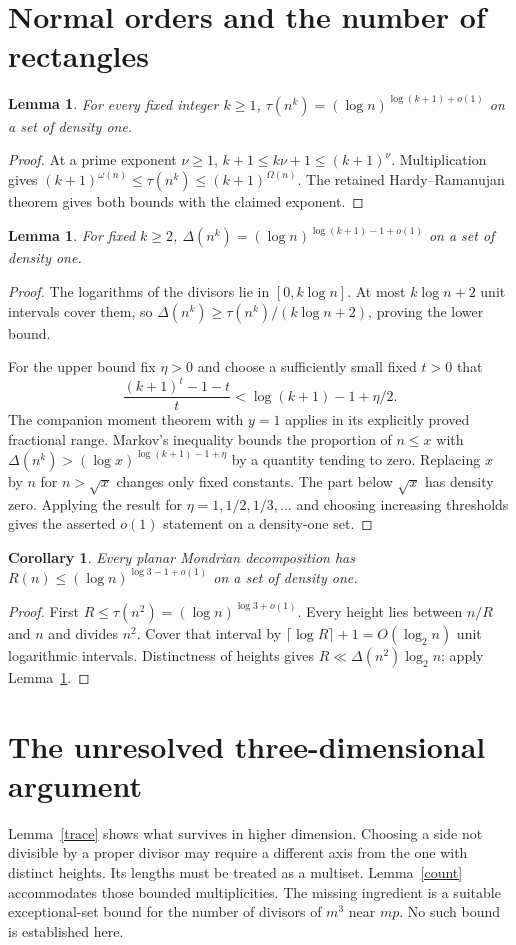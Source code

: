\documentclass[11pt,a4paper]{article}
\newtheorem{lemma}[theorem]{Lemma}
\newtheorem{corollary}[theorem]{Corollary}
\newcommand{\Del}{\Delta}
\newcommand{\om}{\omega}
\newcommand{\Om}{\Omega}
\begin{document}
\section{Normal orders and the number of rectangles}
\begin{lemma}
For every fixed integer $k\ge1$,
$\tau(n^k)=(\log n)^{\log(k+1)+o(1)}$ on a set of density one.
\end{lemma}
\begin{proof}
At a prime exponent $\nu\ge1$,
$k+1\le k\nu+1\le(k+1)^\nu$. Multiplication gives
$(k+1)^{\om(n)}\le\tau(n^k)\le(k+1)^{\Om(n)}$.
The retained Hardy--Ramanujan theorem gives both bounds with the
claimed exponent.
\end{proof}

\begin{lemma}\label{normal}
For fixed $k\ge2$,
$\Del(n^k)=(\log n)^{\log(k+1)-1+o(1)}$ on a set of density one.
\end{lemma}
\begin{proof}
The logarithms of the divisors lie in $[0,k\log n]$. At most
$k\log n+2$ unit intervals cover them, so
$\Del(n^k)\ge\tau(n^k)/(k\log n+2)$, proving the lower bound.

For the upper bound fix $\eta>0$ and choose a sufficiently small
fixed $t>0$ that
\[
 \frac{(k+1)^t-1-t}{t}<\log(k+1)-1+\eta/2.
\]
The companion moment theorem with $y=1$ applies in its explicitly
proved fractional range. Markov's inequality bounds the proportion of
$n\le x$ with
$\Del(n^k)>(\log x)^{\log(k+1)-1+\eta}$ by a quantity tending to zero.
Replacing $x$ by $n$ for $n>\sqrt x$ changes only fixed constants.
The part below $\sqrt x$ has density zero. Applying the result for
$\eta=1,1/2,1/3,\ldots$ and choosing increasing thresholds gives
the asserted $o(1)$ statement on a density-one set.
\end{proof}

\begin{corollary}
Every planar Mondrian decomposition has
$R(n)\le(\log n)^{\log3-1+o(1)}$ on a set of density one.
\end{corollary}
\begin{proof}
First $R\le\tau(n^2)=(\log n)^{\log3+o(1)}$. Every height lies
between $n/R$ and $n$ and divides $n^2$. Cover that interval by
$\lceil\log R\rceil+1=O(\log_2n)$ unit logarithmic intervals.
Distinctness of heights gives
$R\ll\Del(n^2)\log_2n$; apply Lemma~\ref{normal}.
\end{proof}

\section{The unresolved three-dimensional argument}
Lemma~\ref{trace} shows what survives in higher dimension. Choosing a
side not divisible by a proper divisor may require a different axis
from the one with distinct heights. Its lengths must be treated as a
multiset. Lemma~\ref{count} accommodates those bounded multiplicities.
The missing ingredient is a suitable exceptional-set bound for the
number of divisors of $m^3$ near $mp$. No such bound is established here.
\end{document}
